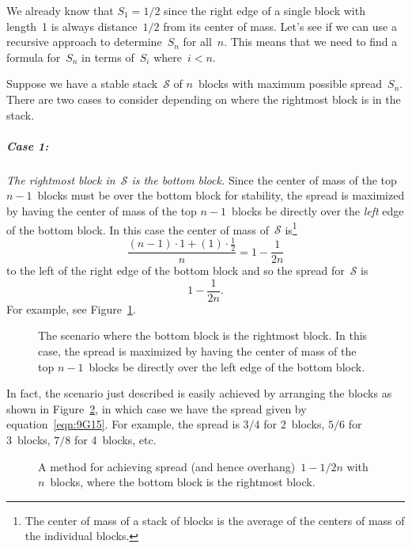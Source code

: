We already know that $S_1 = 1/2$ since the right edge of a single
block with length~1 is always distance~$1/2$ from its center of mass.
Let's see if we can use a recursive approach to determine~$S_n$ for
all~$n$.  This means that we need to find a formula for~$S_n$ in terms
of~$S_i$ where~$i < n$.

Suppose we have a stable stack~$\mathcal{S}$ of $n$~blocks with
maximum possible spread~$S_n$.  There are two cases to consider
depending on where the rightmost block is in the stack.

\subparagraph{Case 1:}

\emph{The rightmost block in~$\mathcal{S}$ is the bottom block.}
Since the center of mass of the top $n - 1$~blocks must be over the
bottom block for stability, the spread is maximized by having the
center of mass of the top $n - 1$~blocks be directly over the
\emph{left} edge of the bottom block.  In this case the center of mass
of~$\mathcal{S}$ is\footnote{The center of mass of a stack of blocks
  is the average of the centers of mass of the individual blocks.}
\[
\frac{ (n - 1) \cdot 1 + (1) \cdot \frac{1}{2} }{ n }
    = 1 - \frac{1}{2n}
\]
to the left of the right edge of the bottom block and so the spread
for~$\mathcal{S}$ is
\begin{equation}\label{eqn:9G15}
    1 - \frac{1}{2n}.
\end{equation}
For example, see Figure~\ref{fig:9G14}.

\begin{figure}


\caption{The scenario where the bottom block is the rightmost block.
  In this case, the spread is maximized by having the center of mass
  of the top $n-1$~blocks be directly over the left edge of the bottom
block.}

\label{fig:9G14}

\end{figure}

In fact, the scenario just described is easily achieved by arranging
the blocks as shown in Figure~\ref{fig:9G15}, in which case we have
the spread given by equation~\ref{eqn:9G15}.  For example, the spread
is $3/4$ for 2~blocks, $5/6$ for 3~blocks, $7/8$ for 4~blocks, etc.

\begin{figure}


\caption{A method for achieving spread (and hence overhang)~$1 - 1/2n$
  with $n$~blocks, where the bottom block is the rightmost block.}

\label{fig:9G15}

\end{figure}

